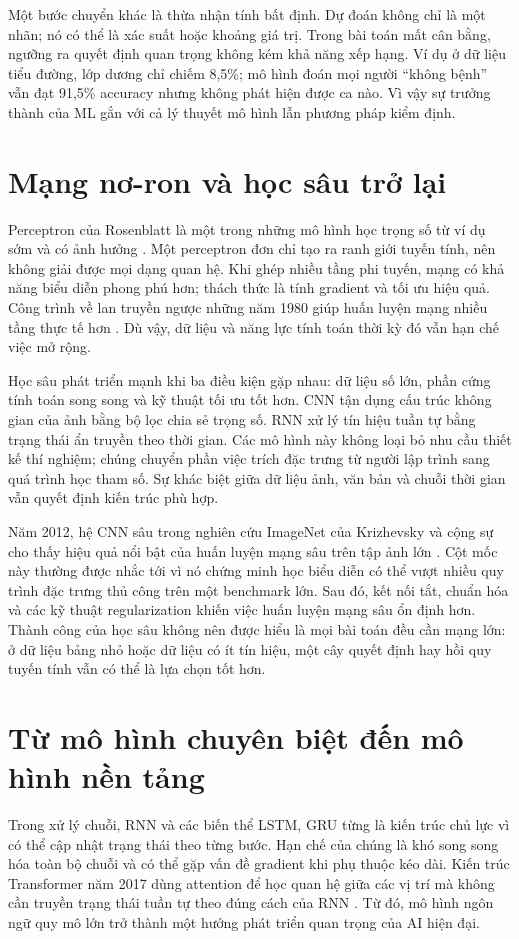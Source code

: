 \documentclass[12pt,a4paper]{report}
\begin{document}
Một bước chuyển khác là thừa nhận tính bất định. Dự đoán không chỉ là một nhãn; nó có thể là xác suất hoặc khoảng giá trị. Trong bài toán mất cân bằng, ngưỡng ra quyết định quan trọng không kém khả năng xếp hạng. Ví dụ ở dữ liệu tiểu đường, lớp dương chỉ chiếm 8,5\%; mô hình đoán mọi người ``không bệnh'' vẫn đạt 91,5\% accuracy nhưng không phát hiện được ca nào. Vì vậy sự trưởng thành của ML gắn với cả lý thuyết mô hình lẫn phương pháp kiểm định.

\section{Mạng nơ-ron và học sâu trở lại}
Perceptron của Rosenblatt là một trong những mô hình học trọng số từ ví dụ sớm và có ảnh hưởng \cite{rosenblatt1958}. Một perceptron đơn chỉ tạo ra ranh giới tuyến tính, nên không giải được mọi dạng quan hệ. Khi ghép nhiều tầng phi tuyến, mạng có khả năng biểu diễn phong phú hơn; thách thức là tính gradient và tối ưu hiệu quả. Công trình về lan truyền ngược những năm 1980 giúp huấn luyện mạng nhiều tầng thực tế hơn \cite{rumelhart1986}. Dù vậy, dữ liệu và năng lực tính toán thời kỳ đó vẫn hạn chế việc mở rộng.

Học sâu phát triển mạnh khi ba điều kiện gặp nhau: dữ liệu số lớn, phần cứng tính toán song song và kỹ thuật tối ưu tốt hơn. CNN tận dụng cấu trúc không gian của ảnh bằng bộ lọc chia sẻ trọng số. RNN xử lý tín hiệu tuần tự bằng trạng thái ẩn truyền theo thời gian. Các mô hình này không loại bỏ nhu cầu thiết kế thí nghiệm; chúng chuyển phần việc trích đặc trưng từ người lập trình sang quá trình học tham số. Sự khác biệt giữa dữ liệu ảnh, văn bản và chuỗi thời gian vẫn quyết định kiến trúc phù hợp.

Năm 2012, hệ CNN sâu trong nghiên cứu ImageNet của Krizhevsky và cộng sự cho thấy hiệu quả nổi bật của huấn luyện mạng sâu trên tập ảnh lớn \cite{alexnet2012}. Cột mốc này thường được nhắc tới vì nó chứng minh học biểu diễn có thể vượt nhiều quy trình đặc trưng thủ công trên một benchmark lớn. Sau đó, kết nối tắt, chuẩn hóa và các kỹ thuật regularization khiến việc huấn luyện mạng sâu ổn định hơn. Thành công của học sâu không nên được hiểu là mọi bài toán đều cần mạng lớn: ở dữ liệu bảng nhỏ hoặc dữ liệu có ít tín hiệu, một cây quyết định hay hồi quy tuyến tính vẫn có thể là lựa chọn tốt hơn.

\section{Từ mô hình chuyên biệt đến mô hình nền tảng}
Trong xử lý chuỗi, RNN và các biến thể LSTM, GRU từng là kiến trúc chủ lực vì có thể cập nhật trạng thái theo từng bước. Hạn chế của chúng là khó song song hóa toàn bộ chuỗi và có thể gặp vấn đề gradient khi phụ thuộc kéo dài. Kiến trúc Transformer năm 2017 dùng attention để học quan hệ giữa các vị trí mà không cần truyền trạng thái tuần tự theo đúng cách của RNN \cite{transformer2017}. Từ đó, mô hình ngôn ngữ quy mô lớn trở thành một hướng phát triển quan trọng của AI hiện đại.
\end{document}
